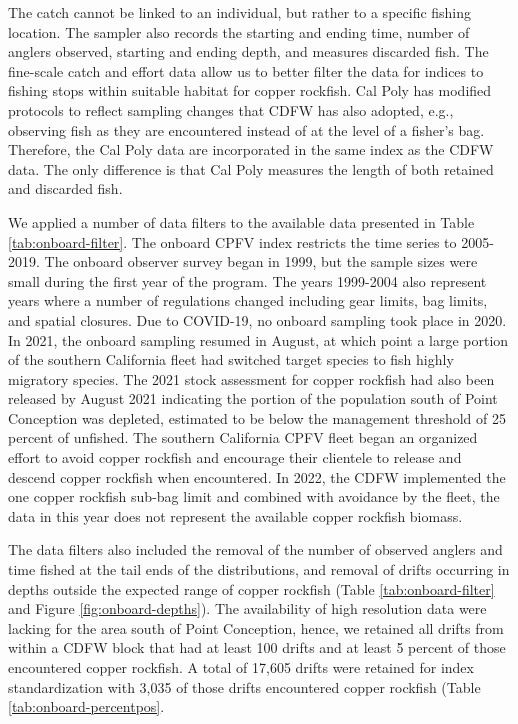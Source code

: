 \documentclass[11pt,
  english,
  letterpaper,
]{article}
\begin{document}
The catch cannot be linked to an individual, but rather to a specific fishing location. The sampler also records the starting and ending time, number of anglers observed, starting and ending depth, and measures discarded fish. The fine-scale catch and effort data allow us to better filter the data for indices to fishing stops within suitable habitat for copper rockfish. Cal Poly has modified protocols to reflect sampling changes that CDFW has also adopted, e.g., observing fish as they are encountered instead of at the level of a fisher's bag. Therefore, the Cal Poly data are incorporated in the same index as the CDFW data. The only difference is that Cal Poly measures the length of both retained and discarded fish.

We applied a number of data filters to the available data presented in Table \ref{tab:onboard-filter}. The onboard CPFV index restricts the time series to 2005-2019. The onboard observer survey began in 1999, but the sample sizes were small during the first year of the program. The years 1999-2004 also represent years where a number of regulations changed including gear limits, bag limits, and spatial closures. Due to COVID-19, no onboard sampling took place in 2020. In 2021, the onboard sampling resumed in August, at which point a large portion of the southern California fleet had switched target species to fish highly migratory species. The 2021 stock assessment for copper rockfish had also been released by August 2021 indicating the portion of the population south of Point Conception was depleted, estimated to be below the management threshold of 25 percent of unfished. The southern California CPFV fleet began an organized effort to avoid copper rockfish and encourage their clientele to release and descend copper rockfish when encountered. In 2022, the CDFW implemented the one copper rockfish sub-bag limit and combined with avoidance by the fleet, the data in this year does not represent the available copper rockfish biomass.

The data filters also included the removal of the number of observed anglers and time fished at the tail ends of the distributions, and removal of drifts occurring in depths outside the expected range of copper rockfish (Table \ref{tab:onboard-filter} and Figure \ref{fig:onboard-depths}). The availability of high resolution data were lacking for the area south of Point Conception, hence, we retained all drifts from within a CDFW block that had at least 100 drifts and at least 5 percent of those encountered copper rockfish. A total of 17,605 drifts were retained for index standardization with 3,035 of those drifts encountered copper rockfish (Table \ref{tab:onboard-percentpos}.
\end{document}
